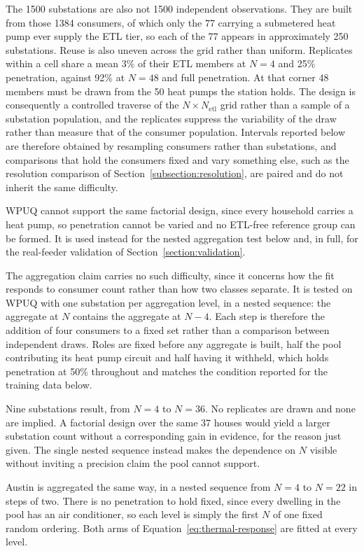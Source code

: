 \documentclass[9pt,journal,a4]{IEEEtran}
\begin{document}
The 1500 substations are also not 1500 independent observations. They are built from those 1384 consumers, of which only the 77 carrying a submetered heat pump ever supply the ETL tier, so each of the 77 appears in approximately 250 substations. Reuse is also uneven across the grid rather than uniform. Replicates within a cell share a mean 3\% of their ETL members at $N = 4$ and 25\% penetration, against 92\% at $N = 48$ and full penetration. At that corner 48 members must be drawn from the 50 heat pumps the station holds. The design is consequently a controlled traverse of the $N \times N_{\mathrm{etl}}$ grid rather than a sample of a substation population, and the replicates suppress the variability of the draw rather than measure that of the consumer population. Intervals reported below are therefore obtained by resampling consumers rather than substations, and comparisons that hold the consumers fixed and vary something else, such as the resolution comparison of Section~\ref{subsection:resolution}, are paired and do not inherit the same difficulty.

WPUQ cannot support the same factorial design, since every household carries a heat pump, so penetration cannot be varied and no ETL-free reference group can be formed. It is used instead for the nested aggregation test below and, in full, for the real-feeder validation of Section~\ref{section:validation}.

The aggregation claim carries no such difficulty, since it concerns how the fit responds to consumer count rather than how two classes separate. It is tested on WPUQ with one substation per aggregation level, in a nested sequence: the aggregate at $N$ contains the aggregate at $N-4$. Each step is therefore the addition of four consumers to a fixed set rather than a comparison between independent draws. Roles are fixed before any aggregate is built, half the pool contributing its heat pump circuit and half having it withheld, which holds penetration at 50\% throughout and matches the condition reported for the training data below.

Nine substations result, from $N = 4$ to $N = 36$. No replicates are drawn and none are implied. A factorial design over the same 37 houses would yield a larger substation count without a corresponding gain in evidence, for the reason just given. The single nested sequence instead makes the dependence on $N$ visible without inviting a precision claim the pool cannot support.

Austin is aggregated the same way, in a nested sequence from $N = 4$ to $N = 22$ in steps of two. There is no penetration to hold fixed, since every dwelling in the pool has an air conditioner, so each level is simply the first $N$ of one fixed random ordering. Both arms of Equation~\eqref{eq:thermal-response} are fitted at every level.
\end{document}
